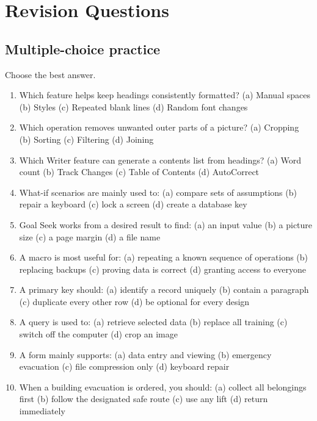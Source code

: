 \documentclass[11pt,openany,oneside]{book}
\begin{document}
\appendix
\chapter{Revision Questions}
\section{Multiple-choice practice}
Choose the best answer.
\begin{enumerate}
\item Which feature helps keep headings consistently formatted? (a) Manual spaces (b) Styles (c) Repeated blank lines (d) Random font changes
\item Which operation removes unwanted outer parts of a picture? (a) Cropping (b) Sorting (c) Filtering (d) Joining
\item Which Writer feature can generate a contents list from headings? (a) Word count (b) Track Changes (c) Table of Contents (d) AutoCorrect
\item What-if scenarios are mainly used to: (a) compare sets of assumptions (b) repair a keyboard (c) lock a screen (d) create a database key
\item Goal Seek works from a desired result to find: (a) an input value (b) a picture size (c) a page margin (d) a file name
\item A macro is most useful for: (a) repeating a known sequence of operations (b) replacing backups (c) proving data is correct (d) granting access to everyone
\item A primary key should: (a) identify a record uniquely (b) contain a paragraph (c) duplicate every other row (d) be optional for every design
\item A query is used to: (a) retrieve selected data (b) replace all training (c) switch off the computer (d) crop an image
\item A form mainly supports: (a) data entry and viewing (b) emergency evacuation (c) file compression only (d) keyboard repair
\item When a building evacuation is ordered, you should: (a) collect all belongings first (b) follow the designated safe route (c) use any lift (d) return immediately
\end{enumerate}
\end{document}
